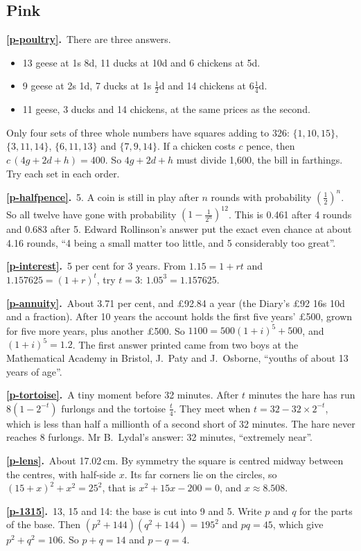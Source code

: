 \documentclass[11pt,a4paper]{article}
\newcounter{prob}
\newcommand{\ans}[2]{\par\smallskip\noindent\textbf{\ref{#1}.}\ #2}
\begin{document}
\subsection*{\color{bandpink}Pink}
\ans{p-poultry}{There are three answers.
\begin{itemize}[nosep]
\item 13 geese at 1s 8d, 11 ducks at 10d and 6 chickens at 5d.
\item 9 geese at 2s 1d, 7 ducks at 1s $\tfrac12$d and 14 chickens at 6$\tfrac14$d.
\item 11 geese, 3 ducks and 14 chickens, at the same prices as the second.
\end{itemize}
Only four sets of three whole numbers have squares adding to 326: $\{1,10,15\}$,
$\{3,11,14\}$, $\{6,11,13\}$ and $\{7,9,14\}$. If a chicken costs $c$ pence, then
$c\,(4g + 2d + h) = 400$. So $4g + 2d + h$ must divide 1,600, the bill in farthings. Try
each set in each order.}
\ans{p-halfpence}{5. A coin is still in play after $n$ rounds with probability
$\left(\tfrac12\right)^n$. So all twelve have gone with probability
$\left(1 - \tfrac1{2^n}\right)^{12}$. This is 0.461 after 4 rounds and 0.683 after 5.
Edward Rollinson's answer put the exact even chance at about 4.16 rounds, ``4 being a
small matter too little, and 5 considerably too great''.}
\ans{p-interest}{5 per cent for 3 years. From $1.15 = 1 + rt$ and
$1.157625 = (1+r)^t$, try $t = 3$: $1.05^3 = 1.157625$.}
\ans{p-annuity}{About 3.71 per cent, and \pounds92.84 a year (the Diary's \pounds92 16s 10d and a
fraction). After 10 years the account holds the first five years' \pounds500, grown for five
more years, plus another \pounds500. So $1100 = 500(1+i)^5 + 500$, and $(1+i)^5 = 1.2$. The
first answer printed came from two boys at the Mathematical Academy in Bristol, J.~Paty
and J.~Osborne, ``youths of about 13 years of age''.}
\ans{p-tortoise}{A tiny moment before 32 minutes. After $t$ minutes the hare has run
$8\left(1 - 2^{-t}\right)$ furlongs and the tortoise $\tfrac t4$. They meet when
$t = 32 - 32\times2^{-t}$, which is less than half a millionth of a second short of 32
minutes. The hare never reaches 8 furlongs. Mr B.~Lydal's answer: 32 minutes,
``extremely near''.}
\ans{p-lens}{About 17.02\,cm. By symmetry the square is centred midway between the
centres, with half-side $x$. Its far corners lie on the circles, so
$(15 + x)^2 + x^2 = 25^2$, that is $x^2 + 15x - 200 = 0$, and $x \approx 8.508$.}
\ans{p-1315}{13, 15 and 14: the base is cut into 9 and 5. Write $p$ and $q$ for the
parts of the base. Then $(p^2 + 144)(q^2 + 144) = 195^2$ and $pq = 45$, which give
$p^2 + q^2 = 106$. So $p + q = 14$ and $p - q = 4$.}
\end{document}
